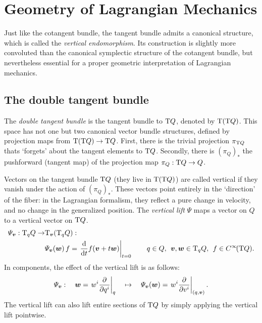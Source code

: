 \chapter{Geometry of Lagrangian Mechanics}
\label{app:symplectic_geometry}

Just like the cotangent bundle, the tangent bundle admits a canonical structure, which is called the \emph{vertical endomorphism}. Its construction is slightly more convoluted than the canonical symplectic structure of the cotangent bundle, but nevertheless essential for a proper geometric interpretation of Lagrangian mechanics. 

\section{The double tangent bundle} The \emph{double tangent bundle} is the tangent bundle to $\mathrm{T}Q$, denoted by $\mathrm{T}(\mathrm{T}Q)$. This space has not one but two canonical vector bundle structures, defined by projection maps from $\mathrm{T}(\mathrm{T}Q) \to \mathrm{T}Q$. First, there is the trivial projection $\pi_{\mathrm{T}Q}$ thats `forgets' about the tangent elements to $\mathrm{T}Q$. Secondly, there is $ (\pi_{Q})_* $ the pushforward (tangent map) of the projection map $\pi_Q: \mathrm{T}Q \to Q$. \cite{Abraham1978}
\begin{center}
\end{center}
Vectors on the tangent bundle $\mathrm{T}Q$ (they live in $\mathrm{T}(\mathrm{T}Q)$) are called vertical if they vanish under the action of $ (\pi_Q)_* $. These vectors point entirely in the `direction' of the fiber: in the Lagrangian formalism, they reflect a pure change in velocity, and no change in the generalized position. The \emph{vertical lift} $\Psi$ maps a vector on $Q$ to a vertical vector on $\mathrm{T}Q$. \cite{Carinena1990}
\begin{equation}
    \begin{split}
        \Psi_{\vec{v}}: \tspace{q}{Q} \to & \tspace{\vec{v}}{\qty(\tspace{q}{Q})}: \\ 
        & \Psi_{\vec{v}}(\vec{w})\,f = \left. \dv{}{t} f(\vec{v} + t\vec{w})\right |_{t = 0}
        \qquad q \in Q,\:\: \vec{v},\vec{w}\in \tspace{q}{Q},\:\: f \in \functions{\tbundle{Q}}.
    \end{split}
\end{equation}
In components, the effect of the vertical lift is as follows:
$$\Psi_{\vec{v}}: \quad \vec{w} = \left. w^i \pdv{}{q^i}\right|_q \quad \mapsto \quad  \Psi_{\vec{v}}(\vec{w}) = \left.w^i \pdv{}{v^i}\right|_{(q, \vec{v})}. $$
The vertical lift can also lift entire sections of $\mathrm{T}Q$ by simply applying the vertical lift pointwise.

